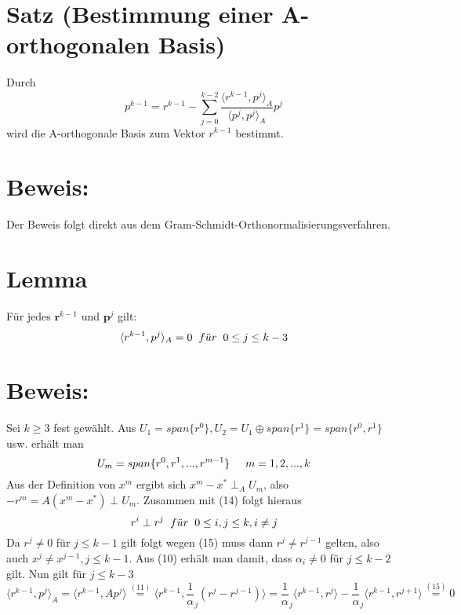 \documentclass{article}
\begin{document}
\section{Satz (Bestimmung einer A-orthogonalen Basis)}
Durch
\begin{equation}
p^{k-1} = r^{k-1} - \sum_{j=0}^{k-2} \frac {\langle r^{k-1}, p^{j} \rangle _{A}} {\langle p^{j}, p^{j} \rangle _{A}} p^{j}
\end{equation}
wird die A-orthogonale Basis zum Vektor $r^{k-1}$ bestimmt.

\section{Beweis:}
Der Beweis folgt direkt aus dem Gram-Schmidt-Orthonormalisierungsverfahren.

\section{Lemma}
Für jedes $\textbf{r}^{k-1}$ und $\textbf{p}^{j}$ gilt:
\begin{equation*}
\langle r^{k-1}, p^{j} \rangle _{A} = 0 \hspace{2mm} f\ddot{u}r \hspace{2mm} 0 \le j \le k-3
\end{equation*}

\section{Beweis:}
Sei $k \ge 3$ fest gewählt. Aus $U_{1} = span\{r^{0}\}, U_{2} = U_{1} \oplus span\{r^{1}\} = span\{r^{0}, r^{1}\}$ usw. erhält man
\begin{equation}
U_{m} = span\{r^{0}, r^{1},...,r^{m-1}\} \hspace{5mm} m = 1,2,...,k
\end{equation}
Aus der Definition von $x^{m}$ ergibt sich $x^{m} - x^{*} \perp_{A} U_{m}$, also $-r^{m} = A(x^{m} - x^{*}) \perp U_{m}$. Zusammen mit (14) folgt hieraus
\begin{equation}
r^{i} \perp r^{j} \hspace{2mm} f\ddot{u}r \hspace{2mm} 0 \le i,j \le k, i \ne j
\end{equation}
Da $r^{j} \ne 0$ für $j \le k-1$ gilt folgt wegen (15) muss dann $r^{j} \ne r^{j-1}$ gelten, also auch $x^{j} \ne x^{j-1}, j \le k-1$. Aus (10) erhält man damit,
dass $\alpha_{i} \ne 0$ für $j \le k-2$ gilt. Nun gilt für $j \le k-3$
\begin{equation*}
\langle r^{k-1}, p^{j} \rangle _{A} =
\langle r^{k-1}, Ap^{j} \rangle \overset{(11)}{=} \langle r^{k-1}, {\frac 1 \alpha_{j} (r^{j} - r^{j-1})} \rangle =
\frac 1 \alpha_{j} \langle r^{k-1}, r^{j} \rangle - \frac 1 \alpha_{j} \langle r^{k-1}, r^{j+1} \rangle \overset{(15)}{=} 0
\end{equation*}
\end{document}
